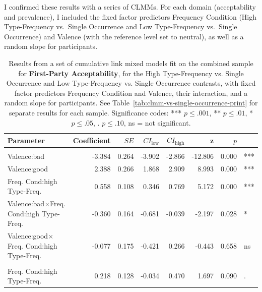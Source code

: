 \documentclass[
]{article}
\begin{document}
I confirmed these results with a series of CLMMs. For each domain (acceptability and prevalence), I included the fixed factor predictors Frequency Condition (High Type-Frequency vs.~Single Occurrence and Low Type-Frequency vs.~Single Occurrence) and Valence (with the reference level set to neutral), as well as a random slope for participants.

\begin{table}
\centering\centering
\caption{\label{tab:clmm-vs-single-occurrence-combined-print-first-party-acceptability}Results from a set of cumulative link mixed models fit on the combined sample for \textbf{First-Party Acceptability}, for the High Type-Frequency vs. Single Occurrence and Low Type-Frequency vs. Single Occurrence contrasts, with fixed factor predictors Frequency Condition and Valence, their interaction, and a random slope for participants. See Table~\ref{tab:clmm-vs-single-occurrence-print} for separate results for each sample. Significance codes: *** $p \leq .001$, ** $p \leq .01$, * $p \leq .05$, . $p \leq .10$, ns = not significant.}
\centering
\begin{tabular}[t]{lrrrrrrl}
\toprule
Parameter & Coefficient & $\mathit{SE}$ & $CI_{\text{low}}$ & $CI_{\text{high}}$ & z & $p$ &  \\
\midrule
\addlinespace[0.3em]
\multicolumn{8}{l}{\textbf{High Type-Frequency vs. Single Occurrence}}\\
\hspace{1em}Valence:bad & -3.384 & 0.264 & -3.902 & -2.866 & -12.806 & 0.000 & ***\\
\hspace{1em}Valence:good & 2.388 & 0.266 & 1.868 & 2.909 & 8.993 & 0.000 & ***\\
\hspace{1em}Freq. Cond:high Type-Freq. & 0.558 & 0.108 & 0.346 & 0.769 & 5.172 & 0.000 & ***\\
\hspace{1em}Valence:bad$\times$Freq. Cond:high Type-Freq. & -0.360 & 0.164 & -0.681 & -0.039 & -2.197 & 0.028 & *\\
\hspace{1em}Valence:good$\times$Freq. Cond:high Type-Freq. & -0.077 & 0.175 & -0.421 & 0.266 & -0.443 & 0.658 & ns\\
\addlinespace[0.3em]
\multicolumn{8}{l}{\textbf{High Type-Frequency vs. Single Occurrence - bad valence only}}\\
\hspace{1em}Freq. Cond:high Type-Freq. & 0.218 & 0.128 & -0.034 & 0.470 & 1.697 & 0.090 & .\\

\end{tabular}
\end{table}
\end{document}
